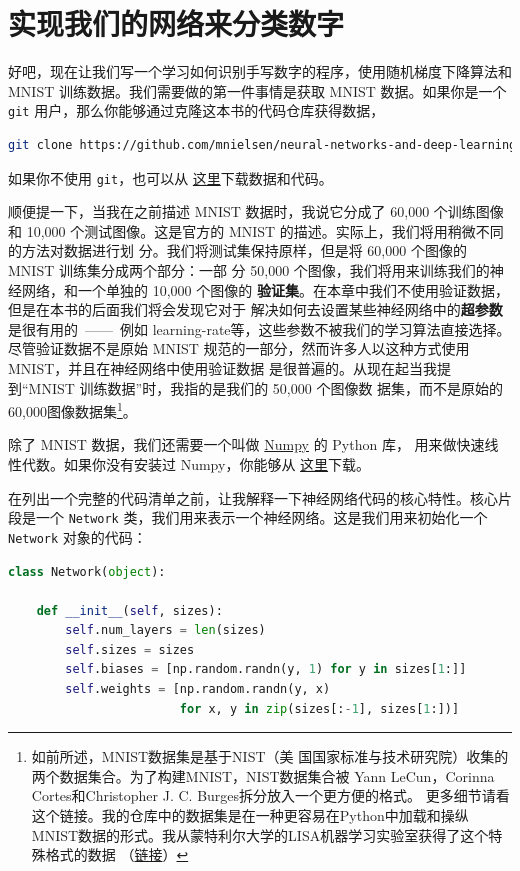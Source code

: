 \section{实现我们的网络来分类数字}
\label{sec:implementing_our_network_to_classify_digits}

好吧，现在让我们写一个学习如何识别手写数字的程序，使用随机梯度下降算法和 MNIST
训练数据。我们需要做的第一件事情是获取 MNIST 数据。如果你是一个 \lstinline!git!
用户，那么你能够通过克隆这本书的代码仓库获得数据，

\begin{lstlisting}[language=sh]
git clone https://github.com/mnielsen/neural-networks-and-deep-learning.git
\end{lstlisting}

如果你不使用 \lstinline!git!，也可以从%
\href{https://github.com/mnielsen/neural-networks-and-deep-learning/archive/master.zip}{
  这里}下载数据和代码。

顺便提一下，当我在之前描述 MNIST 数据时，我说它分成了 60,000 个训练图像和 10,000
个测试图像。这是官方的 MNIST 的描述。实际上，我们将用稍微不同的方法对数据进行划
分。我们将测试集保持原样，但是将 60,000 个图像的 MNIST 训练集分成两个部分：一部
分 50,000 个图像，我们将用来训练我们的神经网络，和一个单独的 10,000 个图像的%
\textbf{验证集}。在本章中我们不使用验证数据，但是在本书的后面我们将会发现它对于
解决如何去设置某些神经网络中的\textbf{超参数}是很有用的~——~例如%
\gls*{learning-rate}等，这些参数不被我们的学习算法直接选择。尽管验证数据不是原始
MNIST 规范的一部分，然而许多人以这种方式使用 MNIST，并且在神经网络中使用验证数据
是很普遍的。从现在起当我提到“MNIST 训练数据”时，我指的是我们的 50,000 个图像数
据集，而不是原始的 60,000图像数据集\footnote{如前所述，MNIST数据集是基于NIST（美
    国国家标准与技术研究院）收集的两个数据集合。为了构建MNIST，NIST数据集合被
  Yann LeCun，Corinna Cortes和Christopher J. C. Burges拆分放入一个更方便的格式。
  更多细节请看这个链接。我的仓库中的数据集是在一种更容易在Python中加载和操纵
  MNIST数据的形式。我从蒙特利尔大学的LISA机器学习实验室获得了这个特殊格式的数据
  （\href{http://www.deeplearning.net/tutorial/gettingstarted.html}{链接}）}。

除了 MNIST 数据，我们还需要一个叫做 \href{http://numpy.org/}{Numpy} 的 Python 库，
用来做快速线性代数。如果你没有安装过 Numpy，你能够从%
\href{http://www.scipy.org/install.html}{这里}下载。

在列出一个完整的代码清单之前，让我解释一下神经网络代码的核心特性。核心片段是一个
\lstinline!Network! 类，我们用来表示一个神经网络。这是我们用来初始化一个
\lstinline!Network! 对象的代码：
\begin{lstlisting}[language=Python]
class Network(object):

	def __init__(self, sizes):
		self.num_layers = len(sizes)
		self.sizes = sizes
		self.biases = [np.random.randn(y, 1) for y in sizes[1:]]
		self.weights = [np.random.randn(y, x)
						for x, y in zip(sizes[:-1], sizes[1:])]
\end{lstlisting}

